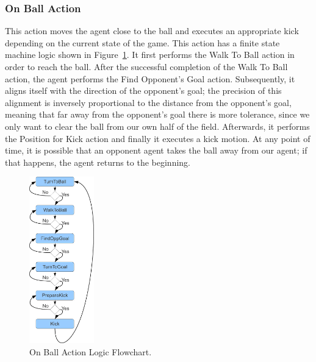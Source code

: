 \subsubsection*{On Ball Action} This action moves the agent close to the ball and executes an appropriate kick depending on the current state of the game. This action has a finite state machine logic shown in Figure~\ref{fig:GoKickBallToGoal}. It first performs the Walk To Ball action in order to reach the ball. After the successful completion of the Walk To Ball action, the agent performs the Find Opponent's Goal action. Subsequently, it aligns itself with the direction of the opponent's goal; the precision of this alignment is inversely proportional to the distance from the opponent's goal, meaning that far away from the opponent's goal there is more tolerance, since we only want to clear the ball from our own half of the field. Afterwards, it performs the Position for Kick action and finally it executes a kick motion. At any point of time, it is possible that an opponent agent takes the ball away from our agent; if that happens, the agent returns to the beginning.


 \begin{figure}[t!]
\centering
  \includegraphics[width=0.25\textwidth]{Chapter3/figures/KickFSM.pdf}
  \caption{On Ball Action Logic Flowchart.}
  \label{fig:GoKickBallToGoal}
\end{figure}



